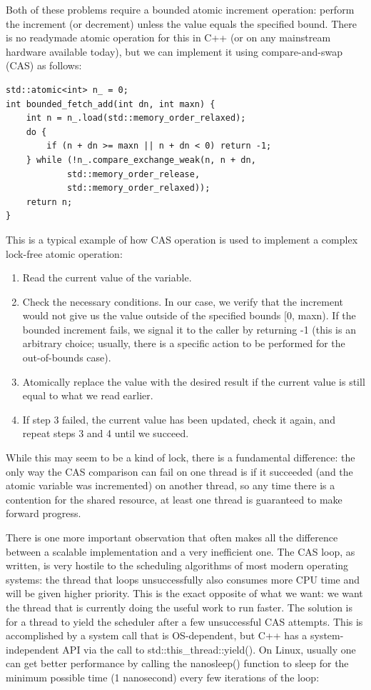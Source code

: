 Both of these problems require a bounded atomic increment operation: perform the increment (or decrement) unless the value equals the specified bound. There is no readymade atomic operation for this in C++ (or on any mainstream hardware available today), but we can implement it using compare-and-swap (CAS) as follows:

\begin{lstlisting}[style=styleCXX]
std::atomic<int> n_ = 0;
int bounded_fetch_add(int dn, int maxn) {
	int n = n_.load(std::memory_order_relaxed);
	do {
		if (n + dn >= maxn || n + dn < 0) return -1;
	} while (!n_.compare_exchange_weak(n, n + dn,
			std::memory_order_release,
			std::memory_order_relaxed));
	return n;
}
\end{lstlisting}

This is a typical example of how CAS operation is used to implement a complex lock-free atomic operation:

\begin{enumerate}
\item Read the current value of the variable.
\item Check the necessary conditions. In our case, we verify that the increment would not give us the value outside of the specified bounds [0, maxn). If the bounded increment fails, we signal it to the caller by returning -1 (this is an arbitrary choice; usually, there is a specific action to be performed for the out-of-bounds case).
\item Atomically replace the value with the desired result if the current value is still equal to what we read earlier.
\item If step 3 failed, the current value has been updated, check it again, and repeat steps 3 and 4 until we succeed.
\end{enumerate}

While this may seem to be a kind of lock, there is a fundamental difference: the only way the CAS comparison can fail on one thread is if it succeeded (and the atomic variable was incremented) on another thread, so any time there is a contention for the shared resource, at least one thread is guaranteed to make forward progress.

There is one more important observation that often makes all the difference between a scalable implementation and a very inefficient one. The CAS loop, as written, is very hostile to the scheduling algorithms of most modern operating systems: the thread that loops unsuccessfully also consumes more CPU time and will be given higher priority. This is the exact opposite of what we want: we want the thread that is currently doing the useful work to run faster. The solution is for a thread to yield the scheduler after a few unsuccessful CAS attempts. This is accomplished by a system call that is OS-dependent, but C++ has a system-independent API via the call to std::this\_thread::yield(). On Linux, usually one can get better performance by calling the nanosleep() function to sleep for the minimum possible time (1 nanosecond) every few iterations of the loop:

